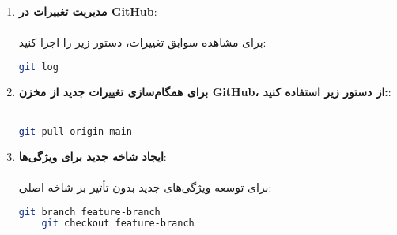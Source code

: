 \begin{enumerate}
     \item \textbf{مدیریت تغییرات در GitHub}:\\\\
     برای مشاهده سوابق تغییرات، دستور زیر را اجرا کنید:
     \begin{terminal}
    \begin{lstlisting}[language=bash]
    git log
    \end{lstlisting}
    \end{terminal} 

    \item \textbf{برای همگام‌سازی تغییرات جدید از مخزن GitHub، از دستور زیر استفاده کنید:}:\\\\
    \begin{terminal}
    \begin{lstlisting}[language=bash]
    git pull origin main
    \end{lstlisting}
    \end{terminal} 

    \item \textbf{ایجاد شاخه جدید برای ویژگی‌ها}:\\\\
    برای توسعه ویژگی‌های جدید بدون تأثیر بر شاخه اصلی:
    \begin{terminal}
    \begin{lstlisting}[language=bash]
    git branch feature-branch
    git checkout feature-branch
    \end{lstlisting}
    \end{terminal} 
    
    
\end{enumerate}
